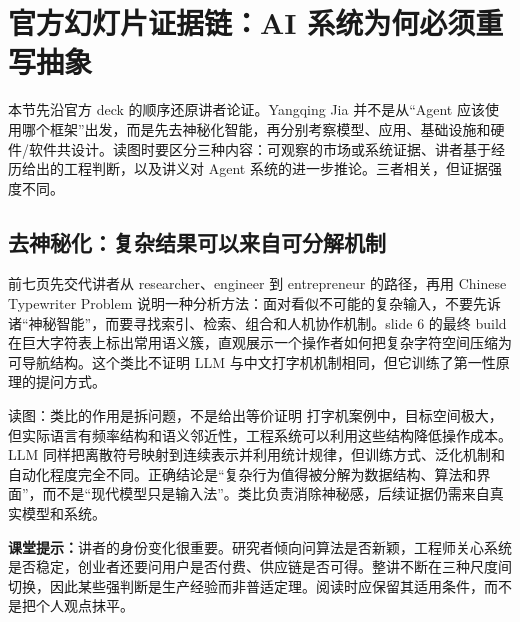\section{官方幻灯片证据链：AI 系统为何必须重写抽象}

本节先沿官方 deck 的顺序还原讲者论证。Yangqing Jia 并不是从“Agent 应该使用哪个框架”出发，而是先去神秘化智能，再分别考察模型、应用、基础设施和硬件/软件共设计。读图时要区分三种内容：可观察的市场或系统证据、讲者基于经历给出的工程判断，以及讲义对 Agent 系统的进一步推论。三者相关，但证据强度不同。

\subsection{去神秘化：复杂结果可以来自可分解机制}

前七页先交代讲者从 researcher、engineer 到 entrepreneur 的路径，再用 Chinese Typewriter Problem 说明一种分析方法：面对看似不可能的复杂输入，不要先诉诸“神秘智能”，而要寻找索引、检索、组合和人机协作机制。slide 6 的最终 build 在巨大字符表上标出常用语义簇，直观展示一个操作者如何把复杂字符空间压缩为可导航结构。这个类比不证明 LLM 与中文打字机机制相同，但它训练了第一性原理的提问方式。


\begin{knowledgebox}{读图：类比的作用是拆问题，不是给出等价证明}
打字机案例中，目标空间极大，但实际语言有频率结构和语义邻近性，工程系统可以利用这些结构降低操作成本。LLM 同样把离散符号映射到连续表示并利用统计规律，但训练方式、泛化机制和自动化程度完全不同。正确结论是“复杂行为值得被分解为数据结构、算法和界面”，而不是“现代模型只是输入法”。类比负责消除神秘感，后续证据仍需来自真实模型和系统。
\end{knowledgebox}

\textbf{课堂提示：}讲者的身份变化很重要。研究者倾向问算法是否新颖，工程师关心系统是否稳定，创业者还要问用户是否付费、供应链是否可得。整讲不断在三种尺度间切换，因此某些强判断是生产经验而非普适定理。阅读时应保留其适用条件，而不是把个人观点抹平。

